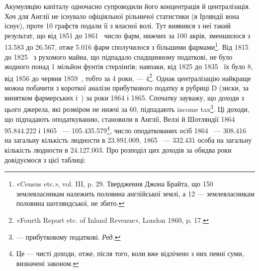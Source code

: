 Акумуляцію капіталу одночасно супроводили його концентрація
й централізація. Хоч для Англії не існувало офіціяльної
рільничої статистики (в Ірляндії вона існує), проте 10 графств подали
її з власної волі. Тут виявився з неї такий результат, що від
1851 до 1861~ число фарм, нижчих за 100 акрів, зменшилося з
\num{13.583} до \num{26.567}, отже \num{5.016} фарм сполучилося з більшими фармами\footnote{
«Census etc.», vol. III, p. 29. Твердження Джона Брайта, що 150
землевласникам належить половина англійської землі, а 12 — землевласникам
половина шотляндської, не збито.
}.  Від 1815 до 1825~ з рухомого майна, що підпадало спадщинному
податкові, не було жодного понад 1 мільйон фунтів стерлінґів;
навпаки, від 1825 до 1835~ їх було 8, від 1856 до червня
1859~, тобто за 4 роки, — 4\footnote{
«Fourth Report etc. of Inland Revenue», London 1860, p. 17.
}. Однак централізацію найкраще
можна побачити з короткої аналізи прибуткового податку
в рубриці D (зиски, за винятком фармерських і~) за роки
1864 і 1865. Спочатку зауважу, що доходи з цього джерела,
які розміром не нижчі за 60, підпадають
income tax\footnote*{
— прибутковому податкові. \emph{Ред.}
}. Ці доходи, що підпадають оподаткуванню, становили
в Англії, Велзі й Шотляндії 1864~ \num{95.844.222}
і 1865~ — \num{105.435.579}\footnote{
Це — чисті доходи, отже, після того, коли вже відлічено з них
певні суми, визначені законом.
}, число оподаткованих
осіб 1864~ — \num{308.416} на загальну кількість людности в
\num{23.891.009}, 1865~ — \num{332.431} особа на загальну кількість людности
в \num{24.127.003}. Про розподіл цих доходів за обидва роки
довідуємося з цієї таблиці:
